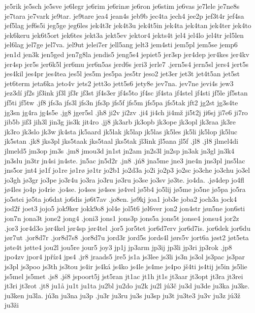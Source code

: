 {{je5rik
je5sch
je5sve
je6legr
je6rim
je6rinæ
je6ron
je6stim
je6vas
je7lele
je7ne8s
je7tara
je7vark
je9tar.
je9tare
jea4
jean4s
jeb9b
jec4ta
jech4
jee2p
jef3t4r
jef4sa
jef5lag
jef6s5i
jeg5ge
jeg6les
jek4t3r
jek4t3u
jek4t5in
jek4ta
jek4tan
jek4ter
jek4to
jek6keru
jek6t5ort
jek6tes
jekt3a
jekt5ev
jektor4
jekts4t
jel4
jel4lo
jel4tr
jel5len
jel6lag
jel7ge
jel7va.
jel9ut
jelei7er
jell5ang
jelt3
jem4sti
jem5pl
jem5se
jemp6
jen1d
jen3k
jen5ged
jen7g8la
jendis5
jeng5s4
jepiet5
jer3sp
jer4dep
jer4kes
jer4kv
jer4sp
jer5s
jer6k5l
jer6mu
jer6n5as
jerd6s
jeri3
jerle7
.jern5s4
jern5sl
jers4
jert5s
jes4kil
jes4pr
jes4tea
jes5l
jes5m
jes5pa
jes5tr
jeso2
jet3er
jet3t
jet4t5an
jet5st
jet6term
jeta6ka
jeto4v
jets2
jett3o
jett5s6
jety8e
jev7na.
jev7ne
jevi4s
jew3
jez3dí
jf2s
jf3ink
jf3l
jf3r
jf3st
jf4s3er
jf4s5to
jf4sc
jf4sta
jf4stel
jf4sti
jf5le
jf5stan
jf5ti
jf5tw
.jf8
jfs3a
jfs3l
jfs3n
jfs3p
jfs5f
jfs5m
jfs5pa
jfs5tak
jft2
jg2st
jg3s4te
jg3sn
jg4ra
jg4s5e
.jg8
jger5sl
.jh8
ji2v
ji2zv
.ji4
ji4ch
ji4mž
ji5t2j
ji6sj
ji7e6
ji7ro
jib5b
jif3
jih3l
jin3g
jis3k
jit4ro
.jj8
jk3arb
jk3opb
jk3ope
jk3opl
jk3raa
jk3re
jk3ro
jk3slo
jk3w
jk4sta
jk5aard
jk5lak
jk5lap
jk5las
jk5les
jk5li
jk5lop
jk5luc
jk5stan
.jk8
jks3pl
jks5taak
jks5taal
jks5tak
jl3ink
jl5ana
jl5f
.jl8
.jł8
jlmel4di
jlmeld5
jm3op
jm3s
.jm8
jmou3d
jn1st
jn2am
jn2s3l
jn2sp
jn3ak
jn3gl
jn3k4
jn3slu
jn3tr
jn4si
jn4ste.
jn5ac
jn5d2r
.jn8
.jń8
jna5me
jne3
jne4n
jns3pl
jns5lac
jns5or
jnt4
jø1f
jo1re
jø1rø
jø1tr
jo2b1
jo2d3a
jo2i
jo2p3
jo2sc
jo3che
jo3chu
jo3el
jo3gh
jø3gr
jo3pe
jo3r4u
jo3ra
jo3ru
jø3ru
jo3se
jo3sv
jø3te.
jo4da.
.jø4dep
jo4fl
jø4les
jo4p
jo4rie
.jo4se.
jo4ses
jø4ses
jø4vel
jø5b4
jo5lij
jø5me
jo5ne
jø5pa
jo5ra
jo5stei
jø5ta
jo6dat
jo6dis
jø6t7av
.jo8en.
jø9kj
joa1
job3e
joba2
joch3a
jock4
jod2ř
joet3
jojo5
jok9ker
jokk9o8
jol4e
jol5t6
jøl6ver
jon2
jon4str
jøn5ne
jon6sti
jon7n
jona3t
jone2
jong4
.joni3
jons1
jons3p
jons5a
jons5t
jonse4
jonsu4
jor2z
.jor3
jor4d3o
jør4kel
jør4sp
jør4tel
.jor5
jor5tet
jor6d7erv
jor6d7is.
jor6dek
jor6du
jør7ut
.jor8d7r
.jor8d7s8
.jor8d7u
jord3r
jord5s
jords4l
jørs5v
jort6a
jøst2
jøt5eta
jøte4t
jøtte4
jou2l
jou5re
jour5
joy3
jp1j
jp3arm
jp3ij
jp3li
jp3ri
jp3rok
.jp8
jpo4zv
jpor4
jpříz4
jps4
.jr8
jraads5
jre5
js1a
js3lee
js3li
js3n
js3ol
js3pac
js3par
js3pl
js3poo
js3th
js3tou
js4ir
js4ká
js4ko
js4le
js4me
js4po
jš4ti
js4tij
js5in
js5lie
js5mel
js5met
.js8
.jś8
jspoort5j
jst5ran
jt1ac
jt1h
jt1s
jt3aar
jt3opt
jt3ra
jt3rei
jt3ri
jt3rot
.jt8
ju1å
ju1t
ju1ta
ju2bl
ju2do
ju2k
ju2l
jú3č
ju3d
ju3de
ju3ka
ju3ke.
ju3ken
ju3la.
jú3n
ju3na
ju3p
.ju3r
ju3ru
ju3s
ju3sp
ju3t
ju3te3
ju3v
ju3z
jú3ž
ju3ži
}}
